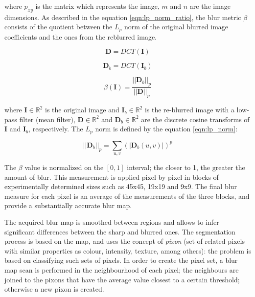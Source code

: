 \noindent where $p_{xy}$ is the matrix which represents the image, $m$ and $n$ are the image dimensions. As described in the equation \ref{eqn:lp_norm_ratio}, the blur metric $\beta$ consists of the quotient between the $L_p$ norm of the original blurred image coefficients and the ones from the reblurred image.

\begin{equation}
\label{eqn:dct_image}
	\mathbf{D} = DCT(\mathbf{I})
\end{equation}

\begin{equation}
\label{eqn:dct_reblurred_image}
	\mathbf{D}_b = DCT(\mathbf{I}_b)
\end{equation}

\begin{equation}
\label{eqn:lp_norm_ratio}
	\beta(\mathbf{I}) = \frac{||\mathbf{D}_b||_p}{||\mathbf{D}||_p}
\end{equation}

\noindent where $\mathbf{I} \in \mathbb{R}^{2}$ is the original image and $\mathbf{I}_b \in \mathbb{R}^{2}$ is the re-blurred image with a low-pass filter (mean filter), $\mathbf{D} \in \mathbb{R}^{2}$ and $\mathbf{D}_b \in \mathbb{R}^{2}$ are the discrete cosine transforms of $\mathbf{I}$ and $\mathbf{I}_b$, respectively. The $L_p$ norm is defined by the equation \ref{eqn:lp_norm}:

\begin{equation}
\label{eqn:lp_norm}
	||\mathbf{D}_b||_p = \sum_{u,v}{(|\mathbf{D}_b(u,v)|)^p}
\end{equation}

\noindent The $\beta$ value is normalized on the $[0,1]$ interval; the closer to 1, the greater the amount of blur. This measurement is applied pixel by pixel in blocks of experimentally determined sizes such as 45x45, 19x19 and 9x9. The final blur measure for each pixel is an average of the measurements of the three blocks, and provide a substantially accurate blur map.

The acquired blur map is smoothed between regions and allows to infer significant differences between the sharp and blurred ones. The segmentation process is based on the map, and uses the concept of \emph{pixon} (set of related pixels with similar properties as colour, intensity, texture, among others): the problem is based on classifying such sets of pixels. In order to create the pixel set, a blur map scan is performed in the neighbourhood of each pixel; the neighbours are joined to the pixons that have the average value closest to a certain threshold; otherwise a new pixon is created.

